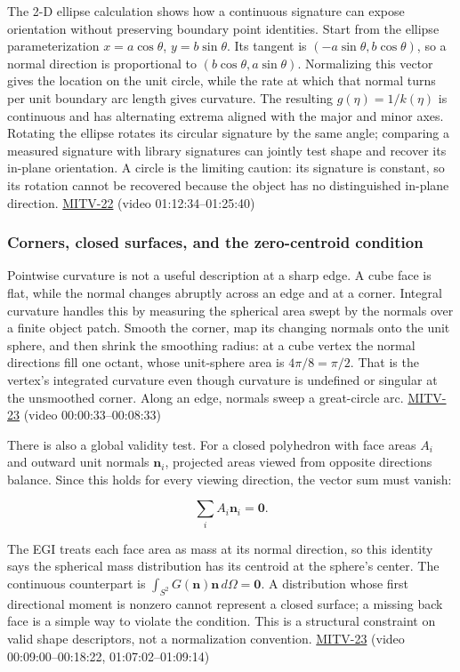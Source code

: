 The 2-D ellipse calculation shows how a continuous signature can expose orientation without preserving boundary point identities. Start from the ellipse parameterization \(x=a\cos\theta\), \(y=b\sin\theta\). Its tangent is \((-a\sin\theta,b\cos\theta)\), so a normal direction is proportional to \((b\cos\theta,a\sin\theta)\). Normalizing this vector gives the location on the unit circle, while the rate at which that normal turns per unit boundary arc length gives curvature. The resulting \(g(\eta)=1/k(\eta)\) is continuous and has alternating extrema aligned with the major and minor axes. Rotating the ellipse rotates its circular signature by the same angle; comparing a measured signature with library signatures can jointly test shape and recover its in-plane orientation. A circle is the limiting caution: its signature is constant, so its rotation cannot be recovered because the object has no distinguished in-plane direction. \hyperref[04-visual-computing-ii-ch036]{MITV-22} (video 01:12:34--01:25:40)

\subsubsection{Corners, closed surfaces, and the zero-centroid condition}\label{corners-closed-surfaces-and-the-zero-centroid-condition}

Pointwise curvature is not a useful description at a sharp edge. A cube face is flat, while the normal changes abruptly across an edge and at a corner. Integral curvature handles this by measuring the spherical area swept by the normals over a finite object patch. Smooth the corner, map its changing normals onto the unit sphere, and then shrink the smoothing radius: at a cube vertex the normal directions fill one octant, whose unit-sphere area is \(4\pi/8=\pi/2\). That is the vertex's integrated curvature even though curvature is undefined or singular at the unsmoothed corner. Along an edge, normals sweep a great-circle arc. \hyperref[04-visual-computing-ii-ch036]{MITV-23} (video 00:00:33--00:08:33)

There is also a global validity test. For a closed polyhedron with face areas \(A_i\) and outward unit normals \(\mathbf n_i\), projected areas viewed from opposite directions balance. Since this holds for every viewing direction, the vector sum must vanish:

\[
\sum_i A_i\mathbf n_i=\mathbf 0.
\]

The EGI treats each face area as mass at its normal direction, so this identity says the spherical mass distribution has its centroid at the sphere's center. The continuous counterpart is \(\int_{S^2}G(\mathbf n)\mathbf n\,d\Omega=\mathbf 0\). A distribution whose first directional moment is nonzero cannot represent a closed surface; a missing back face is a simple way to violate the condition. This is a structural constraint on valid shape descriptors, not a normalization convention. \hyperref[04-visual-computing-ii-ch036]{MITV-23} (video 00:09:00--00:18:22, 01:07:02--01:09:14)

